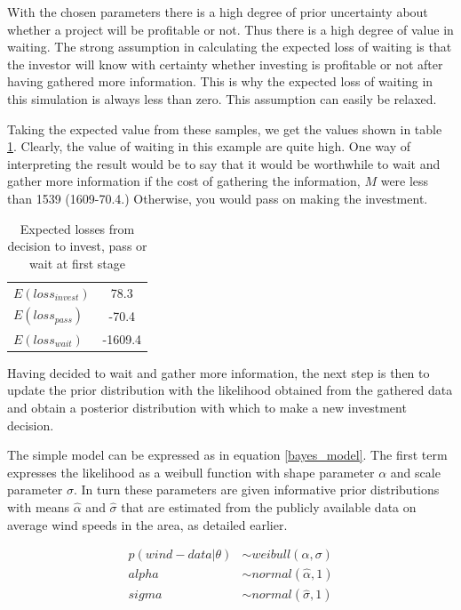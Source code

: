 \documentclass[11pt]{article}
\begin{document}
With the chosen parameters there is a high degree of prior uncertainty about whether a project will be profitable or not. Thus there is a high degree of value in waiting. The strong assumption in calculating the expected loss of waiting is that the investor will know with certainty whether investing is profitable or not after having gathered more information. This is why the expected loss of waiting in this simulation is always less than zero. This assumption can easily be relaxed.

Taking the expected value from these samples, we get the values shown in table \ref{table:expected_losses}. Clearly, the value of waiting in this example are quite high. One way of interpreting the result would be to say that it would be worthwhile to wait and gather more information if the cost of gathering the information, $M$ were less than 1539 (1609-70.4.) Otherwise, you would pass on making the investment. 

\begin{table}
\begin{center}
\begin{tabular}{l c}
$E(loss_{invest})$ & 78.3 \\
$E(loss_{pass})$ & -70.4 \\
$E(loss_{wait})$ & -1609.4 \\

\end{tabular}
\caption{Expected losses from decision to invest, pass or wait at first stage}
\label{table:expected_losses}
\end{center}
\end{table}

Having decided to wait and gather more information, the next step is then to update the prior distribution with the likelihood obtained from the gathered data and obtain a posterior distribution with which to make a new investment decision.

The simple model can be expressed as in equation \ref{bayes_model}. The first term expresses the likelihood as a weibull function with shape parameter $\alpha$ and scale parameter $\sigma$. In turn these parameters are given informative prior distributions with means $\hat{\alpha}$ and $\hat{\sigma}$ that are estimated from the publicly available data on average wind speeds in the area, as detailed earlier.   

\begin{align}
p(wind-data|\theta) &\sim weibull(\alpha, \sigma)\\
alpha &\sim normal(\hat{\alpha}, 1)\\
sigma &\sim normal(\hat{\sigma}, 1)
\label{bayes_model}
\end{align}
\end{document}
